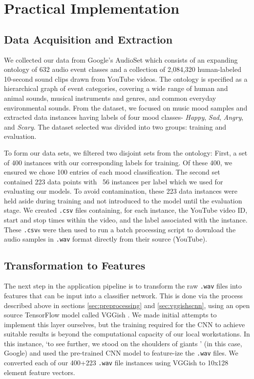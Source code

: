 \documentclass{article}
\begin{document}
\section{Practical Implementation}

\subsection{Data Acquisition and Extraction}

We collected our data from Google’s AudioSet \cite{audioset} which consists of an expanding ontology of 632 audio event classes and a collection of 2,084,320 human-labeled 10-second sound clips drawn from YouTube videos. The ontology is specified as a hierarchical graph of event categories, covering a wide range of human and animal sounds, musical instruments and genres, and common everyday environmental sounds. From the dataset, we focused on music mood samples and extracted data instances having labels of four mood classes- \textit{Happy}, \textit{Sad}, \textit{Angry}, and \textit{Scary}. The dataset selected was divided into two groups: training and evaluation. 

To form our data sets, we filtered two disjoint sets from the ontology: First, a set of 400 instances with our corresponding labels for training. Of these 400, we ensured we chose 100 entries of each mood classification. The second set contained 223 data points with ~56 instances per label which we used for evaluating our models. To avoid contamination, these 223 data instances were held aside during training and not introduced to the model until the evaluation stage. We created \texttt{.csv} files containing, for each instance, the YouTube video ID, start and stop times within the video, and the label associated with the instance. These \texttt{.csv}s were then used to run a batch processing script to download the audio samples in \texttt{.wav} format directly from their source (YouTube).

\subsection{Transformation to Features}
The next step in the application pipeline is to transform the raw \texttt{.wav} files into features that can be input into a classifier network. This is done via the process described above in sections \ref{sec:preprocessing} and \ref{sec:vggishscnn}, using an open source TensorFlow model called VGGish \cite{vggish}. We made initial attempts to implement this layer ourselves, but the training required for the CNN to achieve suitable results is beyond the computational capacity of our local workstations. In this instance, `to see further, we stood on the shoulders of giants \cite{newton}’ (in this case, Google) and used the pre-trained CNN model to feature-ize the \texttt{.wav} files. We converted each of our 400+223 \texttt{.wav} file instances using VGGish to 10x128 element feature vectors.
\end{document}

